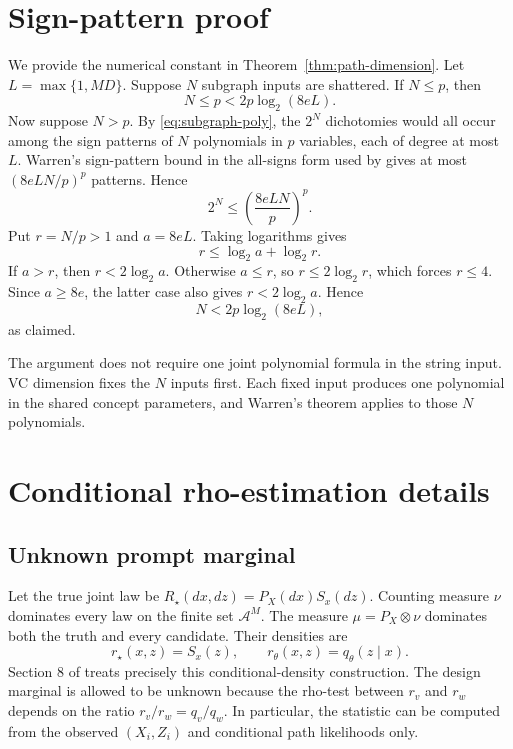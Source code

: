 \documentclass{article}
\theoremstyle{definition}
\theoremstyle{remark}
\newcommand{\cA}{\mathcal A}
\begin{document}



\appendix

\section{Sign-pattern proof}
\label{app:signs}

We provide the numerical constant in Theorem~\ref{thm:path-dimension}. Let $L=\max\{1,MD\}$. Suppose $N$ subgraph inputs are shattered. If $N\le p$, then \[ N\le p<2p\log_2(8eL). \] Now suppose $N>p$. By \eqref{eq:subgraph-poly}, the $2^N$ dichotomies would all occur among the sign patterns of $N$ polynomials in $p$ variables, each of degree at most $L$. Warren's sign-pattern bound in the all-signs form used by \citet{goldberg1995bounding} gives at most $(8eLN/p)^p$ patterns. Hence \[ 2^N\le\left(\frac{8eLN}{p}\right)^p. \] Put $r=N/p>1$ and $a=8eL$. Taking logarithms gives \[ r\le\log_2 a+\log_2 r. \] If $a>r$, then $r<2\log_2 a$. Otherwise $a\le r$, so $r\le2\log_2 r$, which forces $r\le4$. Since $a\ge8e$, the latter case also gives $r<2\log_2 a$. Hence \[ N<2p\log_2(8eL), \] as claimed.

The argument does not require one joint polynomial formula in the string input. VC dimension fixes the $N$ inputs first. Each fixed input produces one polynomial in the shared concept parameters, and Warren's theorem applies to those $N$ polynomials.

\section{Conditional rho-estimation details}
\label{app:rho}

\subsection{Unknown prompt marginal}

Let the true joint law be $R_\star(dx,dz)=P_X(dx)S_x(dz)$. Counting measure $\nu$ dominates every law on the finite set $\cA^M$. The measure $\mu=P_X\otimes\nu$ dominates both the truth and every candidate. Their densities are \[ r_\star(x,z)=S_x(z),\qquad r_\theta(x,z)=q_\theta(z\mid x). \] Section 8 of \citet{baraud2018rho} treats precisely this conditional-density construction. The design marginal is allowed to be unknown because the rho-test between $r_v$ and $r_w$ depends on the ratio $r_v/r_w=q_v/q_w$. In particular, the statistic can be computed from the observed $(X_i,Z_i)$ and conditional path likelihoods only.
\end{document}
